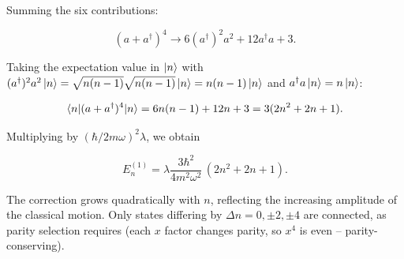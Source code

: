 Summing the six contributions:
\begin{linenomath}
\begin{equation*}
(a+a^{\dagger})^{4} \to 6(a^{\dagger})^{2}a^{2} + 12a^{\dagger}a + 3.
\end{equation*}
\end{linenomath}
Taking the expectation value in $\ket{n}$ with $(a^{\dagger})^{2}a^{2}\ket{n} = \sqrt{n(n-1)}\sqrt{n(n-1)}\ket{n} = n(n-1)\ket{n}$ and $a^{\dagger}a\ket{n}=n\ket{n}$:
\begin{linenomath}
\begin{equation*}
\braket{n|(a+a^{\dagger})^{4}|n} = 6n(n-1) + 12n + 3 = 3(2n^{2}+2n+1).
\end{equation*}
\end{linenomath}
Multiplying by $(\hbar/2m\omega)^{2}\lambda$, we obtain
\begin{linenomath}
\begin{equation}
E_{n}^{(1)} = \lambda\frac{3\hbar^{2}}{4m^{2}\omega^{2}}\,(2n^{2}+2n+1).
\label{eq:anharmonic-first-order}
\end{equation}
\end{linenomath}
The correction grows quadratically with $n$, reflecting the increasing amplitude of the classical motion. Only states differing by $\Delta n = 0,\pm2,\pm4$ are connected, as parity selection requires (each $x$ factor changes parity, so $x^{4}$ is even -- parity-conserving).


